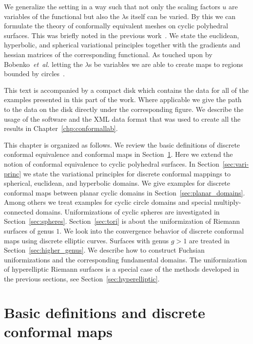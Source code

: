 \documentclass[Thesis]{subfiles}
\begin{document}
We generalize the setting in a way such that not only the scaling factors $u$ are variables of the functional but also the $\lambda$s itself can be varied. 
By this we can formulate the theory of conformally equivalent meshes on cyclic polyhedral surfaces. 
This was briefly noted in the previous work~\cite[p. 2211]{Bobenko2010}.
We state the euclidean, hyperbolic, and spherical variational principles together with the gradients and hessian matrices of the corresponding functional. 
As touched upon by Bobenko~\emph{et~al.} letting the $\lambda$s be variables we are able to create maps to regions bounded by circles~\cite[p. 2212]{Bobenko2010}.

This text is accompanied by a compact disk which contains the data for all of the examples presented in this part of the work. 
Where applicable we give the path to the data on the disk directly under the corresponding figure.
We describe the usage of the software and the XML data format that was used to create all the results in Chapter~\ref{chp:conformallab}.


This chapter is organized as follows. We review the basic definitions of discrete conformal equivalence and conformal maps in Section~\ref{sec:basic_definitions}. Here we extend the notion of conformal equivalence to cyclic polyhedral surfaces.
In Section~\ref{sec:vari-princ} we state the variational principles for discrete conformal mappings to spherical, euclidean, and hyperbolic domains.
We give examples for discrete conformal maps between planar cyclic domains in Section~\ref{sec:planar_domains}. 
Among others we treat examples for cyclic circle domains and special multiply-connected domains.
Uniformizations of cyclic spheres are investigated in Section~\ref{sec:spheres}.
Section~\ref{sec:tori} is about the uniformization of Riemann surfaces of genus $1$.
We look into the convergence behavior of discrete conformal maps using discrete elliptic curves.
 Surfaces with genus $g>1$ are treated in Section~\ref{sec:higher_genus}.
 We describe how to construct Fuchsian uniformizations and the corresponding fundamental domains.
 The uniformization of hyperelliptic Riemann surfaces is a special case of the methods developed in the previous sections, see Section~\ref{sec:hyperelliptic}.
 

\section{Basic definitions and discrete conformal maps}
\label{sec:basic_definitions}
\end{document}
